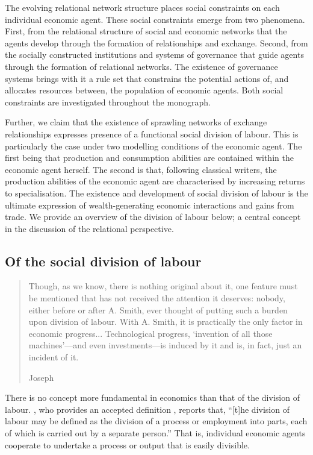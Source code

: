 The evolving relational network structure places social constraints on each individual economic agent. These social constraints emerge from two phenomena. First, from the relational structure of social and economic networks that the agents develop through the formation of relationships and exchange. Second, from the socially constructed institutions and systems of governance that guide agents through the formation of relational networks. The existence of governance systems brings with it a rule set that constrains the potential actions of, and allocates resources between, the population of economic agents. Both social constraints are investigated throughout the monograph.

Further, we claim that the existence of sprawling networks of exchange relationships expresses presence of a functional social division of labour. This is particularly the case under two modelling conditions of the economic agent. The first being that production and consumption abilities are contained within the economic agent herself. The second is that, following classical writers, the production abilities of the economic agent are characterised by increasing returns to specialisation. The existence and development of social division of labour is the ultimate expression of wealth-generating economic interactions and gains from trade. We provide an overview of the division of labour below; a central concept in the discussion of the relational perspective.

\subsection{Of the social division of labour}

\begin{quote}
Though, as we know, there is nothing original about it, one feature must be mentioned that has not received the attention it deserves: nobody, either before or after A. Smith, ever thought of putting such a burden upon division of labour. With A. Smith, it is practically the only factor in economic progress... Technological progress, `invention of all those machines'---and even investments---is induced by it and is, in fact, just an incident of it.

\begin{flushright}
Joseph \citet[p.~182]{Schumpeter1954}
\end{flushright}
\end{quote}

There is no concept more fundamental in economics than that of the division of labour. \citet[p.~901]{Groenewegen1987}, who provides an accepted definition \citep[p.~4]{Sun2005}, reports that, ``[t]he division of labour may be defined as the division of a process or employment into parts, each of which is carried out by a separate person.'' That is, individual economic agents cooperate to undertake a process or output that is easily divisible.

